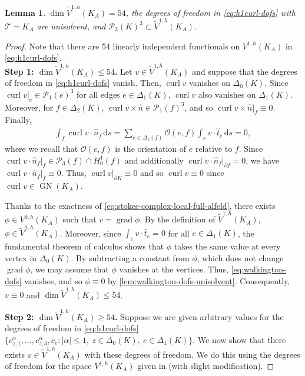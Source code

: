 \documentclass{mcom-l}
\newtheorem{lemma}[theorem]{Lemma}
\theoremstyle{definition}
\theoremstyle{remark}
\numberwithin{equation}{section}
\newcommand{\unitvec}[1]{\hat{#1}}
\renewcommand{\d}[1]{\,\mathrm{d}{#1}}
\DeclareMathOperator{\GN}{GN}
\DeclareMathOperator{\curl}{curl}
\DeclareMathOperator{\grad}{grad}
\newcommand{\mesh}[0]{\mathcal{T}}
\begin{document}
\begin{lemma}
	\label{lem:h1curl-local-unisolvence}
	$\dim \tilde{V}^{1, h}(K_A) = 54$, the degrees of freedom in 
	\cref{eq:h1curl-dofs} with $\mesh = K_A$ are unisolvent, and 
	$\mathcal{P}_2(K)^3 \subset \tilde{V}^{1, h}(K_A)$.	
\end{lemma}
\begin{proof}
	Note that there are 54 linearly independent functionals 
	on $V^{1, h}(K_A)$ in \cref{eq:h1curl-dofs}. \\
	
	\noindent \textbf{Step 1: $\dim \tilde{V}^{1, h}(K_A) \leq 54$. } 
	Let $v \in \tilde{V}^{1, h}(K_A)$ and suppose that 
	the degrees of freedom in \cref{eq:h1curl-dofs} vanish. 
	Then, $\curl v$ vanishes on $\Delta_0(K)$. 
	Since $\curl v|_{e} \in \mathcal{P}_1(e)^3$ 
	for all edges $e \in \Delta_1(K)$, $\curl v$ also vanishes
	on $\Delta_1(K)$. Moreover, for $f \in \Delta_2(K)$,
	$\curl v \times \unitvec{n} \in \mathcal{P}_1(f)^3$,
	and so $\curl v \times \unitvec{n}|_f \equiv 0$.
	Finally,
	\begin{align*}
		\int_{f} \curl v \cdot \unitvec{n}_f \d{s} 
		= \sum_{e \in \Delta_1(f)} \mathcal{O}(e, f) 
		\int_{e} v \cdot \unitvec{t}_{e} \d{s}
		= 0,
	\end{align*}
	where we recall that $\mathcal{O}(e, f)$ is the orientation of $e$ relative 
	to $f$.
	Since $\curl v \cdot \unitvec{n}_f|_f \in \mathcal{P}_3(f) \cap H^1_0(f)$ 
	and additionally $\curl v\cdot \unitvec{n}_f|_{\partial f}
	= 0$, we have $\curl v \cdot \unitvec{n}_f|_{f} \equiv 0$.
	Thus, $\curl v|_{\partial K} \equiv 0$ and 
	so $\curl v \equiv 0$ since 
	$\curl v \in \GN(K_A)$.
	
	Thanks to the exactness of \cref{eq:stokes-complex-local-full-alfeld}, 
	there exists
	$\phi \in V^{0, h}(K_A)$ such that $v = \grad \phi$. 
	By the definition of $\tilde{V}^{1, h}(K_A)$, 
	$\phi \in \tilde{V}^{0, h}(K_A)$. 
	Moreover, since $\int_e v \cdot \unitvec{t}_e = 0$ for all 
	$e \in \Delta_1(K)$, 
	the fundamental theorem of calculus shows that $\phi$ takes the same
	value at every vertex in $\Delta_0(K)$. By subtracting a constant
	from $\phi$, which does not change $\grad \phi$, we may
	assume that $\phi$ vanishes at the vertices. Thus,
	\cref{eq:walkington-dofs} vanishes, and so $\phi \equiv 0$ by 
	\cref{lem:walkington-dofs-unisolvent}.
	Consequently, $v \equiv 0$ and 
	$\dim \tilde{V}^{1, h}(K_A) \leq 54$.
	
	\textbf{Step 2: $\dim \tilde{V}^{1, h}(K_A) \geq 54$. } 
	Suppose we are given
	arbitrary values for the degrees of freedom in \cref{eq:h1curl-dofs}
	$\{ c_{z, 1}^{\alpha}, \ldots, c_{z, 3}^{\alpha}, c_e
	: |\alpha| \leq 1, \ z \in \Delta_0(K), \ e \in \Delta_1(K) \}$.
	We now show that there exists $v \in \tilde{V}^{1, h}(K_A)$ with 
	these degrees of freedom. We do this using the degrees of freedom for 
	the space $V^{1, h}(K_A)$ given in 
	\cite[Lemma 4.11]{FuGuzmanNeilan20} (with slight modification).
	

\end{proof}
\end{document}
